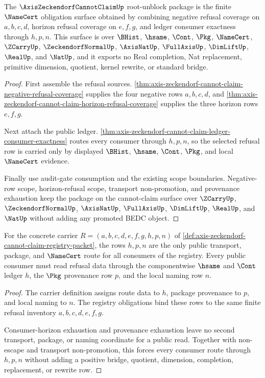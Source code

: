 \begin{theorem}
\label{thm:axis-zeckendorf-cannot-claim-root-unblock-package}
The $\AxisZeckendorfCannotClaimUp$ root-unblock package is the finite $\NameCert$ obligation surface obtained by combining negative refusal coverage on $a,b,c,d$, horizon refusal coverage on $e,f,g$, and ledger consumer exactness through $h,p,n$. This surface is over $\BHist$, $\hsame$, $\Cont$, $\Pkg$, $\NameCert$, $\ZCarryUp$, $\ZeckendorfNormalUp$, $\AxisNatUp$, $\FullAxisUp$, $\DimLiftUp$, $\RealUp$, and $\NatUp$, and it exports no Real completion, Nat replacement, primitive dimension, quotient, kernel rewrite, or standard bridge.
\end{theorem}
\begin{proof}
First assemble the refusal sources. \autoref{thm:axis-zeckendorf-cannot-claim-negative-refusal-coverage} supplies the four negative rows $a,b,c,d$, and \autoref{thm:axis-zeckendorf-cannot-claim-horizon-refusal-coverage} supplies the three horizon rows $e,f,g$.

Next attach the public ledger. \autoref{thm:axis-zeckendorf-cannot-claim-ledger-consumer-exactness} routes every consumer through $h,p,n$, so the selected refusal row is carried only by displayed $\BHist$, $\hsame$, $\Cont$, $\Pkg$, and local $\NameCert$ evidence.

Finally use audit-gate consumption and the existing scope boundaries. Negative-row scope, horizon-refusal scope, transport non-promotion, and provenance exhaustion keep the package on the cannot-claim surface over $\ZCarryUp$, $\ZeckendorfNormalUp$, $\AxisNatUp$, $\FullAxisUp$, $\DimLiftUp$, $\RealUp$, and $\NatUp$ without adding any promoted BEDC object.
\end{proof}

\begin{theorem}
\label{thm:axis-zeckendorf-cannot-claim-ledger-route-scope}
For the concrete carrier $R=(a,b,c,d,e,f,g,h,p,n)$ of \autoref{def:axis-zeckendorf-cannot-claim-registry-packet}, the rows $h,p,n$ are the only public transport, package, and $\NameCert$ route for all consumers of the registry. Every public consumer must read refusal data through the componentwise $\hsame$ and $\Cont$ ledger $h$, the $\Pkg$ provenance row $p$, and the local naming row $n$.
\end{theorem}
\begin{proof}
The carrier definition assigns route data to $h$, package provenance to $p$, and local naming to $n$. The registry obligations bind these rows to the same finite refusal inventory $a,b,c,d,e,f,g$.

Consumer-horizon exhaustion and provenance exhaustion leave no second transport, package, or naming coordinate for a public read. Together with non-escape and transport non-promotion, this forces every consumer route through $h,p,n$ without adding a positive bridge, quotient, dimension, completion, replacement, or rewrite row.
\end{proof}

